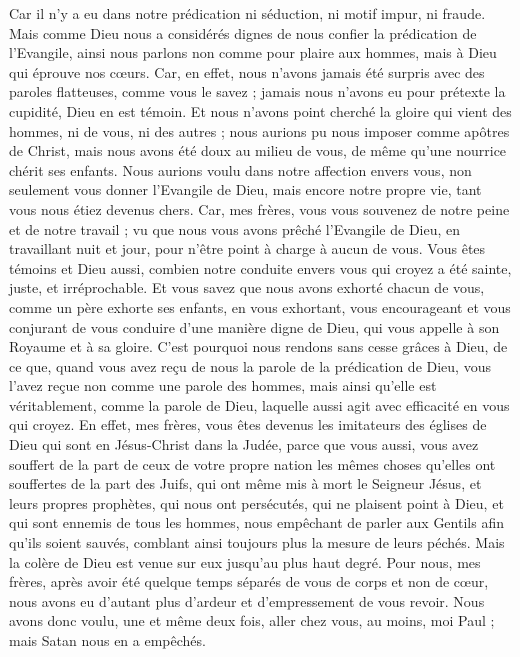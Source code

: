 \begin{multicols}{2}
Car il n'y a eu dans notre prédication ni séduction, ni motif impur, ni fraude.
Mais comme Dieu nous a considérés dignes de nous confier la prédication de l'Evangile, ainsi nous parlons non comme pour plaire aux hommes, mais à Dieu qui éprouve nos cœurs.
Car, en effet, nous n'avons jamais été surpris avec des paroles flatteuses, comme vous le savez ; jamais nous n'avons eu pour prétexte la cupidité, Dieu en est témoin.
Et nous n'avons point cherché la gloire qui vient des hommes, ni de vous, ni des autres ; nous aurions pu nous imposer comme apôtres de Christ,
mais nous avons été doux au milieu de vous, de même qu'une nourrice chérit ses enfants.
Nous aurions voulu dans notre affection envers vous, non seulement vous donner l'Evangile de Dieu, mais encore notre propre vie, tant vous nous étiez devenus chers.
Car, mes frères, vous vous souvenez de notre peine et de notre travail ; vu que nous vous avons prêché l'Evangile de Dieu, en travaillant nuit et jour, pour n'être point à charge à aucun de vous.
Vous êtes témoins et Dieu aussi, combien notre conduite envers vous qui croyez a été sainte, juste, et irréprochable.
Et vous savez que nous avons exhorté chacun de vous, comme un père exhorte ses enfants,
en vous exhortant, vous encourageant et vous conjurant de vous conduire d'une manière digne de Dieu, qui vous appelle à son Royaume et à sa gloire.
C'est pourquoi nous rendons sans cesse grâces à Dieu, de ce que, quand vous avez reçu de nous la parole de la prédication de Dieu, vous l'avez reçue non comme une parole des hommes, mais ainsi qu'elle est véritablement, comme la parole de Dieu, laquelle aussi agit avec efficacité en vous qui croyez.
En effet, mes frères, vous êtes devenus les imitateurs des églises de Dieu qui sont en Jésus-Christ dans la Judée, parce que vous aussi, vous avez souffert de la part de ceux de votre propre nation les mêmes choses qu'elles ont souffertes de la part des Juifs,
qui ont même mis à mort le Seigneur Jésus, et leurs propres prophètes, qui nous ont persécutés, qui ne plaisent point à Dieu, et qui sont ennemis de tous les hommes,
nous empêchant de parler aux Gentils afin qu'ils soient sauvés, comblant ainsi toujours plus la mesure de leurs péchés. Mais la colère de Dieu est venue sur eux jusqu'au plus haut degré.
Pour nous, mes frères, après avoir été quelque temps séparés de vous de corps et non de cœur, nous avons eu d'autant plus d'ardeur et d'empressement de vous revoir.
Nous avons donc voulu, une et même deux fois, aller chez vous, au moins, moi Paul ; mais Satan nous en a empêchés.

\end{multicols}
